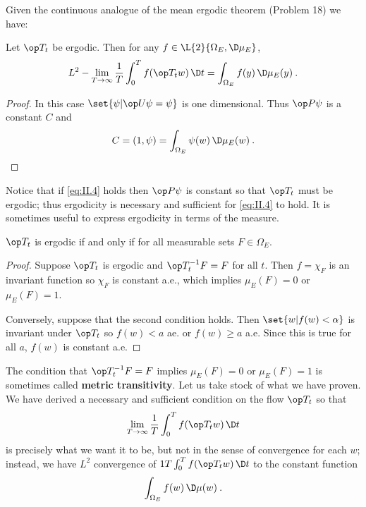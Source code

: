 Given the continuous analogue of the mean ergodic theorem (Problem 18)
we have:
\begin{corollary}
    Let $\op T_t$ be ergodic. Then for any $f \in \L{2}{\Omega_E, \D \mu_E}$, \begin{align}
        L^2 - \lim_{T \rightarrow \infty} \frac{1}{T} \int_0^T f (\op T_t w) \, \D t = \int_{\Omega_E} f(y) \, \D \mu_E(y) \:. \label{eq:II.4}
    \end{align}
\end{corollary}

\begin{proof}
    In this case $\set{\psi | \op U \psi = \psi}$ is one dimensional. Thus $\op P \psi$ is a constant $C$ and \begin{align}
        C = (1 ,\psi) = \int_{\Omega_E} \psi(w) \, \D \mu_E(w) \:.
    \end{align}
\end{proof}
Notice that if \eqref{eq:II.4} holds then $\op P \psi$ is constant so that $\op T_t$ must be ergodic;
thus ergodicity is necessary and sufficient for \eqref{eq:II.4} to hold.
It is sometimes useful to express ergodicity in terms of the measure.

\begin{proposition}
    $\op T_t$ is ergodic if and only if for all measurable sets $F \in \Omega_E$.
\end{proposition}

\begin{proof}
Suppose $\op T_t$ is ergodic and $\op T_t^{-1} F = F$ for all $t$. Then $f = \chi_F$ is an invariant function so $\chi_F$ is constant a.e., which implies $\mu_E(F) = 0$ or $\mu_E(F) = 1$. 

Conversely, suppose that the second condition holds. Then $\set{w | f(w) < \alpha }$ is invariant under $\op T_t$ so $f(w) < a$ ae. or $f(w) \geq a$ a.e. Since this is true for all $a$, $f(w)$ is constant a.e. 
\end{proof}

The condition that $\op T_t^{-1} F = F$ implies $\mu_E(F) = 0$ or $\mu_E(F) = 1$ is sometimes called \textbf{metric transitivity}.
Let us take stock of what we have proven. We have derived a necessary and
sufficient condition on the flow $\op T_t$ so that
\begin{align}
    \lim_{T \rightarrow \infty} \frac{1}{T} \int_0^T f(\op T_t w) \, \D t
\end{align}
is precisely what we want it to be, but not in the sense of convergence for each $w$; instead, we have $L^2$ convergence of ${1}{T} \int_0^T f(\op T_t w) \, \D t$ to the constant
function \begin{align}
    \int_{\Omega_E} f(w) \, \D \mu(w) \:.
\end{align}

